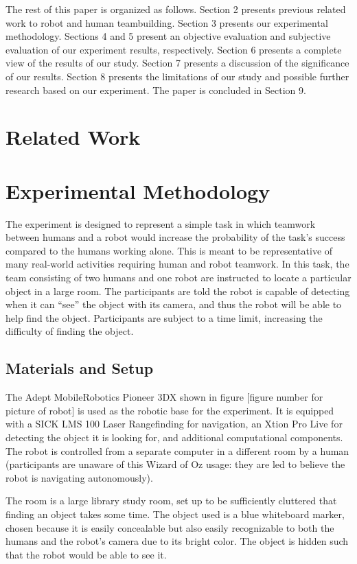 \documentclass{acm_proc_article-sp}
\begin{document}
The rest of this paper is organized as follows. Section 2 presents previous related work to robot and human teambuilding. Section 3 presents our experimental methodology. Sections 4 and 5 present an objective evaluation and subjective evaluation of our experiment results, respectively. Section 6 presents a complete view of the results of our study. Section 7 presents a discussion of the significance of our results. Section 8 presents the limitations of our study and possible further research based on our experiment. The paper is concluded in Section 9.

\section{Related Work}
\section{Experimental Methodology}
The experiment is designed to represent a simple task in which teamwork between humans and a robot would increase the probability of the task's success compared to the humans working alone. This is meant to be representative of many real-world activities requiring human and robot teamwork. In this task, the team consisting of two humans and one robot are instructed to locate a particular object in a large room. The participants are told the robot is capable of detecting when it can ``see'' the object with its camera, and thus the robot will be able to help find the object. Participants are subject to a time limit, increasing the difficulty of finding the object.
\subsection{Materials and Setup}
The Adept MobileRobotics Pioneer 3DX shown in figure [figure number for picture of robot] is used as the robotic base for the experiment. It is equipped with a SICK LMS 100 Laser Rangefinding for navigation, an Xtion Pro Live for detecting the object it is looking for, and additional computational components. The robot is controlled from a separate computer in a different room by a human (participants are unaware of this Wizard of Oz usage: they are led to believe the robot is navigating autonomously).

The room is a large library study room, set up to be sufficiently cluttered that finding an object takes some time. The object used is a blue whiteboard marker, chosen because it is easily concealable but also easily recognizable to both the humans and the robot's camera due to its bright color. The object is hidden such that the robot would be able to see it.
\end{document}

